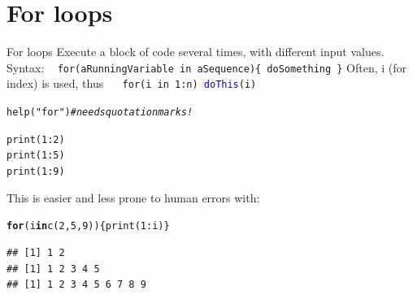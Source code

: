 \documentclass[xcolor=table,      handout ,    xcolor=dvipsnames]{beamer}\usepackage[]{graphicx}\usepackage[]{color}
\makeatletter
\newcommand{\hlnum}[1]{\textcolor[rgb]{0,0,0}{#1}}
\newcommand{\hlstr}[1]{\textcolor[rgb]{0.545,0.137,0.137}{#1}}
\newcommand{\hlcom}[1]{\textcolor[rgb]{0,0.392,0}{\textit{#1}}}
\newcommand{\hlopt}[1]{\textcolor[rgb]{0,0,0}{#1}}
\newcommand{\hlstd}[1]{\textcolor[rgb]{0,0,0}{#1}}
\newcommand{\hlkwa}[1]{\textcolor[rgb]{1,0,0}{\textbf{#1}}}
\newcommand{\hlkwd}[1]{\textcolor[rgb]{0,0,1}{#1}}
\newenvironment{kframe}{%
 \def\at@end@of@kframe{}%
 \ifinner\ifhmode%
  \def\at@end@of@kframe{\end{minipage}}%
  \begin{minipage}{\columnwidth}%
 \fi\fi%
 \def\FrameCommand##1{\hskip\@totalleftmargin \hskip-\fboxsep
 \colorbox{shadecolor}{##1}\hskip-\fboxsep
     \hskip-\linewidth \hskip-\@totalleftmargin \hskip\columnwidth}%
 \MakeFramed {\advance\hsize-\width
   \@totalleftmargin\z@ \linewidth\hsize
   \@setminipage}}%
 {\par\unskip\endMakeFramed%
 \at@end@of@kframe}
\newenvironment{knitrout}{}{} %
\newcommand{\rcode}[1]{\texttt{\textcolor{Blue}{#1}}}
\makeatother
\begin{document}
\section{For loops}

\begin{frame}[fragile]{For loops}
Execute a block of code several times, with different input values.\\
Syntax: ~ \texttt{\alert{for}(aRunningVariable \alert{in} aSequence)\{ doSomething \}}
\pause
Often, i (for index) is used, thus ~~ \texttt{\alert{for}(i \alert{in} 1:n) \rcode{doThis}(i)}
\pause
\begin{knitrout}
\color{fgcolor}\begin{kframe}
\begin{alltt}
\hlkwd{help}\hlstd{(}\hlstr{"for"}\hlstd{)} \hlcom{# needs quotation marks!}
\end{alltt}
\end{kframe}
\end{knitrout}
\pause
\begin{knitrout}
\color{fgcolor}\begin{kframe}
\begin{alltt}
\hlkwd{print}\hlstd{(}\hlnum{1}\hlopt{:}\hlnum{2}\hlstd{)}
\hlkwd{print}\hlstd{(}\hlnum{1}\hlopt{:}\hlnum{5}\hlstd{)}
\hlkwd{print}\hlstd{(}\hlnum{1}\hlopt{:}\hlnum{9}\hlstd{)}
\end{alltt}
\end{kframe}
\end{knitrout}
\pause
This is easier and less prone to human errors with:
\pause
\begin{knitrout}
\color{fgcolor}\begin{kframe}
\begin{alltt}
\hlkwa{for}\hlstd{(i} \hlkwa{in} \hlkwd{c}\hlstd{(}\hlnum{2}\hlstd{,}\hlnum{5}\hlstd{,}\hlnum{9}\hlstd{) ) \{} \hlkwd{print}\hlstd{(}\hlnum{1}\hlopt{:}\hlstd{i) \}}
\end{alltt}
\begin{verbatim}
## [1] 1 2
## [1] 1 2 3 4 5
## [1] 1 2 3 4 5 6 7 8 9
\end{verbatim}
\end{kframe}
\end{knitrout}
\end{frame}
\end{document}
